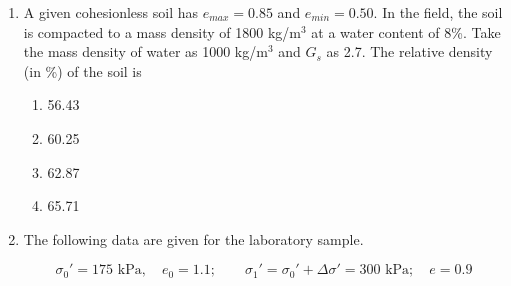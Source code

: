 \documentclass[journal,12pt,onecolumn]{IEEEtran}
\theoremstyle{remark}
\begin{document}
\begin{enumerate}
\textbf{Group I}
\begin{itemize}
\item P. Curve J
\item Q. Curve K
\item R. Curve L
\end{itemize}

\textbf{Group II}
\begin{enumerate}
\item No apparent heaving of soil around the footing
\item Rankine's passive zone develops imperfectly
\item Well defined slip surface extends to ground surface
\end{enumerate}

\begin{multicols}{4}
\begin{enumerate}
\item P - 1, Q - 3, R - 2
\item P - 3, Q - 2, R - 1
\item P - 3, Q - 1, R - 2
\item P - 1, Q - 2, R - 3
\end{enumerate}
\end{multicols}

\item A given cohesionless soil has $e_{max} = 0.85$ and $e_{min} = 0.50$. In the field, the soil is compacted to a mass density of 1800 kg/m$^3$ at a water content of 8\%. Take the mass density of water as 1000 kg/m$^3$ and $G_s$ as 2.7. The relative density (in \%) of the soil is \hfill{}

\begin{multicols}{4}
\begin{enumerate}
\item 56.43
\item 60.25
\item 62.87
\item 65.71
\end{enumerate}
\end{multicols}

\item The following data are given for the laboratory sample. \hfill{}

\[
\sigma_0' = 175 \text{ kPa}, \quad e_0 = 1.1 ; \qquad \sigma_1' = \sigma_0' + \Delta \sigma' = 300 \text{ kPa} ; \quad e = 0.9
\]


\end{enumerate}
\end{document}
